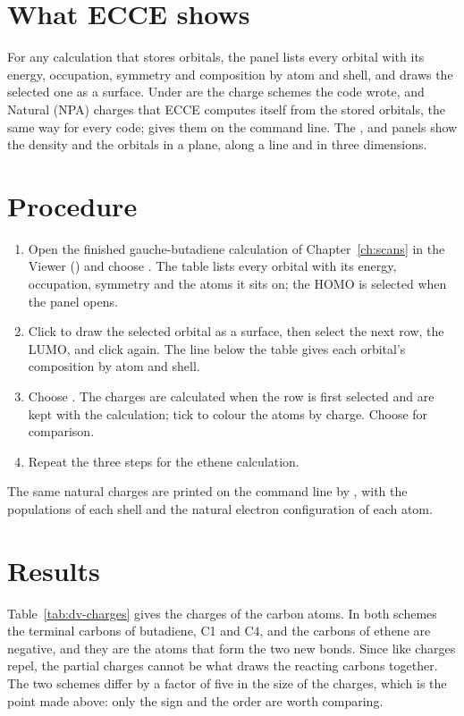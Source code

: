\section{What ECCE shows}
For any calculation that stores orbitals, the  panel lists every orbital with its energy, occupation, symmetry and composition by atom and shell, and draws the selected one as a surface. Under  are the charge schemes the code wrote, and Natural (NPA) charges that ECCE computes itself from the stored orbitals, the same way for every code;  gives them on the command line. The ,  and  panels show the density and the orbitals in a plane, along a line and in three dimensions.

\section{Procedure}
\begin{enumerate}
	\item Open the finished gauche-butadiene calculation of Chapter~\ref{ch:scans} in the Viewer () and choose . The table lists every orbital with its energy, occupation, symmetry and the atoms it sits on; the HOMO is selected when the panel opens.
	\item Click  to draw the selected orbital as a surface, then select the next row, the LUMO, and click  again. The line below the table gives each orbital's composition by atom and shell.
	\item Choose . The charges are calculated when the row is first selected and are kept with the calculation; tick  to colour the atoms by charge. Choose  for comparison.
	\item Repeat the three steps for the ethene calculation.
\end{enumerate}
The same natural charges are printed on the command line by , with the populations of each shell and the natural electron configuration of each atom.

\section{Results}
Table~\ref{tab:dv-charges} gives the charges of the carbon atoms. In both schemes the terminal carbons of butadiene, C1 and C4, and the carbons of ethene are negative, and they are the atoms that form the two new bonds. Since like charges repel, the partial charges cannot be what draws the reacting carbons together. The two schemes differ by a factor of five in the size of the charges, which is the point made above: only the sign and the order are worth comparing.

